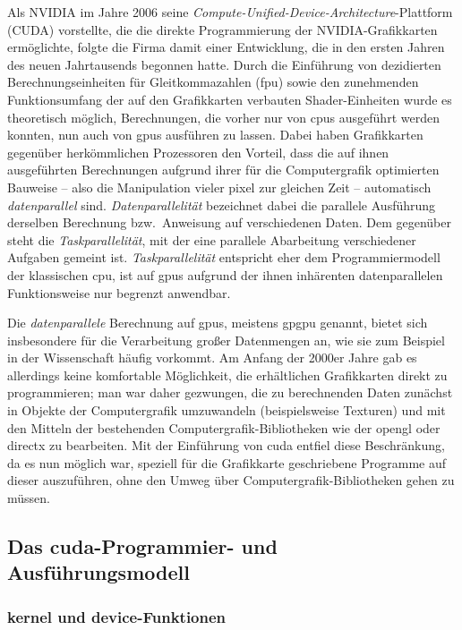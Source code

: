 Als NVIDIA{\textregistered} im Jahre 2006 seine \textit{Compute-Unified-Device-Architecture}-Plattform
(CUDA{\textregistered}) vorstellte, die die direkte Programmierung der NVIDIA{\textregistered}-Grafikkarten ermöglichte,
folgte die Firma damit einer Entwicklung, die in den ersten Jahren des neuen Jahrtausends begonnen hatte. Durch die
Einführung von dezidierten Berechnungseinheiten für Gleitkommazahlen (\gls{fpu}) sowie den zunehmenden Funktionsumfang
der auf den Grafikkarten verbauten Shader-Einheiten wurde es theoretisch möglich, Berechnungen, die vorher nur von
\gls{cpu}s ausgeführt werden konnten, nun auch von \gls{gpu}s ausführen zu lassen. Dabei haben Grafikkarten gegenüber
herkömmlichen Prozessoren den Vorteil, dass die auf ihnen ausgeführten Berechnungen aufgrund ihrer für die
Computergrafik optimierten Bauweise -- also die Manipulation vieler \gls{pixel} zur gleichen Zeit -- automatisch
\textit{datenparallel} sind. \textit{Datenparallelität} bezeichnet dabei die parallele Ausführung derselben Berechnung
bzw.\ Anweisung auf verschiedenen Daten. Dem gegenüber steht die \textit{Taskparallelität}, mit der eine parallele
Abarbeitung verschiedener Aufgaben gemeint ist. \textit{Taskparallelität} entspricht eher dem Programmiermodell der
klassischen \gls{cpu}, ist auf \gls{gpu}s aufgrund der ihnen inhärenten datenparallelen Funktionsweise nur begrenzt
anwendbar.

Die \textit{datenparallele} Berechnung auf \gls{gpu}s, meistens \gls{gpgpu} genannt, bietet sich insbesondere
für die Verarbeitung großer Datenmengen an, wie sie zum Beispiel in der Wissenschaft häufig vorkommt. Am Anfang der
2000er Jahre gab es allerdings keine komfortable Möglichkeit, die erhältlichen Grafikkarten direkt zu programmieren;
man war daher gezwungen, die zu berechnenden Daten zunächst in Objekte der Computergrafik umzuwandeln (beispielsweise 
Texturen) und mit den Mitteln der bestehenden Computergrafik-Bibliotheken wie der \gls{opengl} oder \gls{directx} zu
bearbeiten. Mit der Einführung von \gls{cuda} entfiel diese Beschränkung, da es nun möglich war, speziell für die
Grafikkarte geschriebene Programme auf dieser auszuführen, ohne den Umweg über Computergrafik-Bibliotheken gehen zu
müssen.

\subsection{Das \gls{cuda}-Programmier- und Ausführungsmodell}

\subsubsection{\gls{kernel} und \gls{device}-Funktionen}

